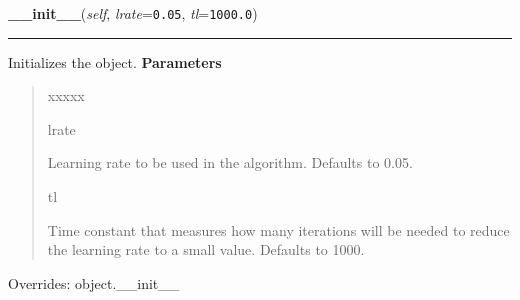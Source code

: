 \hspace{.8\funcindent}\begin{boxedminipage}{\funcwidth}

    \raggedright \textbf{\_\_init\_\_}(\textit{self}, \textit{lrate}={\tt 0.05}, \textit{tl}={\tt 1000.0})

    \vspace{-1.5ex}

    \rule{\textwidth}{0.5\fboxrule}
\setlength{\parskip}{2ex}

Initializes the object.
\setlength{\parskip}{1ex}
      \textbf{Parameters}
      \vspace{-1ex}

      \begin{quote}
        \begin{Ventry}{xxxxx}

          \item[lrate]


Learning rate to be used in the algorithm. Defaults to 0.05.
          \item[tl]


Time constant that measures how many iterations will be needed to
reduce the learning rate to a small value. Defaults to 1000.
        \end{Ventry}

      \end{quote}

      Overrides: object.\_\_init\_\_

    \end{boxedminipage}

    \vspace{0.5ex}


